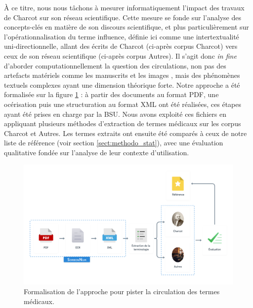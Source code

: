 À ce titre, nous nous tâchons à mesurer informatiquement l'impact des travaux de Charcot sur son réseau scientifique. Cette mesure se fonde sur l'analyse des concepts-clés en matière de son discours scientifique, et plus particulièrement sur l'opérationnalisation du terme \og{}influence\fg{}, définie ici comme une intertextualité uni-directionnelle, allant des écrits de Charcot (ci-après corpus \og{}Charcot\fg{}) vers ceux de son réseau scientifique (ci-après corpus \og{}Autres\fg{}). Il s'agit donc \textit{in fine} d'aborder computationnellement la question des circulations, non pas des artefacts matériels comme les manuscrits \citep{gabay2021katabase} et les images \citep{joyeux2019visual}, mais des phénomènes textuels complexes \citep{manjavacas} ayant une dimension théorique forte. Notre approche a été formalisée sur la figure \ref{fig:formalisation} : à partir des documents au format \textsc{PDF}, une océrisation puis une structuration au format \textsc{XML} ont été réalisées, ces étapes ayant été prises en charge par la \textsc{BSU}. Nous avons exploité ces fichiers en appliquant plusieurs méthodes d’extraction de termes médicaux sur les corpus Charcot et Autres. Les termes extraits ont ensuite été comparés à ceux de notre liste de référence (voir section \ref{sect:methodo_stat}), avec une évaluation qualitative fondée sur l'analyse de leur contexte d'utilisation.

\begin{figure}[!ht]
	\centering
	\includegraphics[width=1\textwidth]{img/formalisation_approche.png}
	\caption{Formalisation de l'approche pour pister la circulation des termes médicaux.}
	\label{fig:formalisation}
\end{figure}
